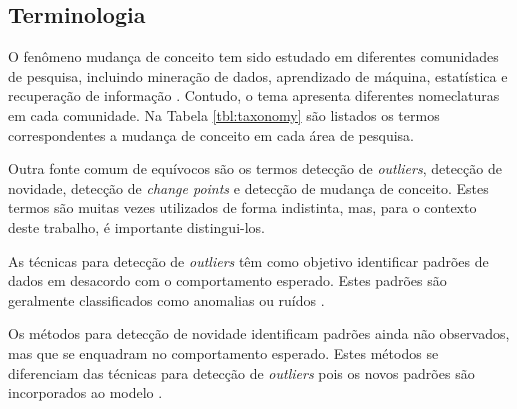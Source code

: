 \documentclass[qual, classic, a4paper]{ufbathesis}
\begin{document}
\subsection{Terminologia}

O fenômeno mudança de conceito tem sido estudado em diferentes comunidades de pesquisa, incluindo mineração de dados, 
aprendizado de máquina, estatística e recuperação de informação \cite{Zliobaite:2010}.
Contudo, o tema apresenta diferentes nomeclaturas em cada comunidade.
Na Tabela \ref{tbl:taxonomy} são listados os termos correspondentes a mudança de conceito em cada área de pesquisa.

\begin{table}[!ht]
    \caption{Terminologia - Mudança de Conceito \cite{Zliobaite:2010}}
    \label{tbl:taxonomy}
    \centering
\end{table}

Outra fonte comum de equívocos são os termos detecção de \textit{outliers}, detecção de novidade, detecção de \textit{change points} e detecção de mudança de conceito.
Estes termos são muitas vezes utilizados de forma indistinta, mas, para o contexto deste trabalho, é importante distingui-los.

As técnicas para detecção de \textit{outliers} têm como objetivo identificar padrões de dados em desacordo com o comportamento esperado. Estes padrões são geralmente classificados como anomalias ou ruídos \cite{Chandola:2009:ADS:1541880.1541882}.

Os métodos para detecção de novidade identificam padrões ainda não observados, mas que se enquadram no comportamento esperado.
Estes métodos se diferenciam das técnicas para detecção de \textit{outliers} pois os novos padrões são incorporados ao modelo \cite{Chandola:2009:ADS:1541880.1541882}.
\end{document}
